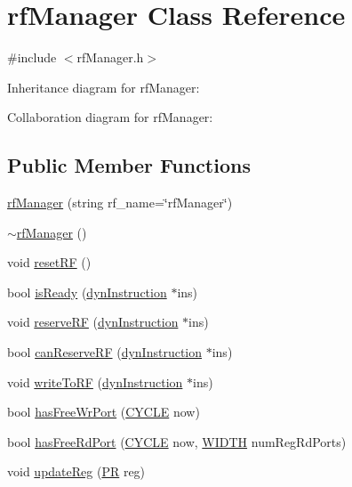 \hypertarget{classrfManager}{
\section{rfManager Class Reference}
\label{classrfManager}
}


{\ttfamily \#include $<$rfManager.h$>$}



Inheritance diagram for rfManager:


Collaboration diagram for rfManager:
\subsection*{Public Member Functions}
\begin{DoxyCompactItemize}
\item 
\hyperlink{classrfManager_a3aba0353412141b854b902f87918d760}{rfManager} (string rf\_\-name=\char`\"{}rfManager\char`\"{})
\item 
\hyperlink{classrfManager_adc5fb894c52570de06137128a65256e3}{$\sim$rfManager} ()
\item 
void \hyperlink{classrfManager_aca3886ea56db6dd13b096be05adee188}{resetRF} ()
\item 
bool \hyperlink{classrfManager_ab5c5242744de56fd2f46c11ac3d9472b}{isReady} (\hyperlink{classdynInstruction}{dynInstruction} $\ast$ins)
\item 
void \hyperlink{classrfManager_ab38c1244739ba189161c3026361464ec}{reserveRF} (\hyperlink{classdynInstruction}{dynInstruction} $\ast$ins)
\item 
bool \hyperlink{classrfManager_a487ae2b2c425f4a15a6ee49fe37d5afd}{canReserveRF} (\hyperlink{classdynInstruction}{dynInstruction} $\ast$ins)
\item 
void \hyperlink{classrfManager_ae5dc11fc5a35d9985601f94e0176d32d}{writeToRF} (\hyperlink{classdynInstruction}{dynInstruction} $\ast$ins)
\item 
bool \hyperlink{classrfManager_a9aad410daccdc0876c0c13cedbbc7855}{hasFreeWrPort} (\hyperlink{global_2global_8h_a7e19a550ec11d1ed921deb20c22efb5b}{CYCLE} now)
\item 
bool \hyperlink{classrfManager_a4297b24b6ce9533206fe5b50554ffa13}{hasFreeRdPort} (\hyperlink{global_2global_8h_a7e19a550ec11d1ed921deb20c22efb5b}{CYCLE} now, \hyperlink{global_2global_8h_a6fa2e24b8a418fa215e183264cbea3aa}{WIDTH} numRegRdPorts)
\item 
void \hyperlink{classrfManager_a1817bd1f92e1d3c3e35d941722a5e5c3}{updateReg} (\hyperlink{global_2global_8h_a54dcae2ba04c76c12afe113b706bd4dc}{PR} reg)
\end{DoxyCompactItemize}


